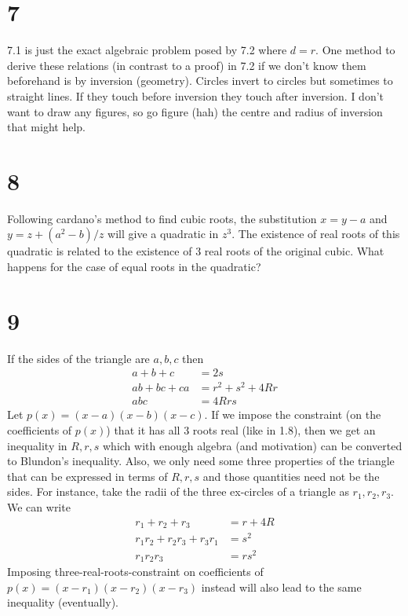 \documentclass{article}
\begin{document}
\section*{7}
7.1 is just the exact algebraic problem posed by 7.2 where $d=r$. One method to derive these relations (in contrast to a proof) in 7.2 if we don't know them beforehand is by inversion (geometry). Circles invert to circles but sometimes to straight lines. If they touch before inversion they touch after inversion. I don't want to draw any figures, so go figure (hah) the centre and radius of inversion that might help.

\section*{8}
Following cardano's method to find cubic roots, the substitution $x = y-a$ and $y = z + (a^2 - b)/z$ will give a quadratic in $z^3$. The existence of real roots of this quadratic is related to the existence of 3 real roots of the original cubic. What happens for the case of equal roots in the quadratic?

\section*{9}
If the sides of the triangle are $a,b,c$ then
\begin{align*}
    a+b+c &= 2s\\
    ab+bc+ca &= r^2 + s^2 + 4Rr \\
    abc &= 4Rrs
\end{align*}
Let $p(x) = (x-a)(x-b)(x-c)$. If we impose the constraint (on the coefficients of $p(x)$) that it has all 3 roots real (like in 1.8), then we get an inequality in $R,r,s$ which with enough algebra (and motivation) can be converted to Blundon's inequality. Also, we only need some three properties of the triangle that can be expressed in terms of $R,r,s$ and those quantities need not be the sides. For instance, take the radii of the three ex-circles of a triangle as $r_1,r_2,r_3$. We can write
\begin{align*}
    r_1 + r_2 + r_3 &= r+4R\\
    r_1r_2 + r_2r_3 + r_3r_1 &= s^2\\
    r_1r_2r_3 &= rs^2
\end{align*}
Imposing three-real-roots-constraint on coefficients of $p(x) = (x-r_1)(x-r_2)(x-r_3)$ instead will also lead to the same inequality (eventually).
\end{document}

